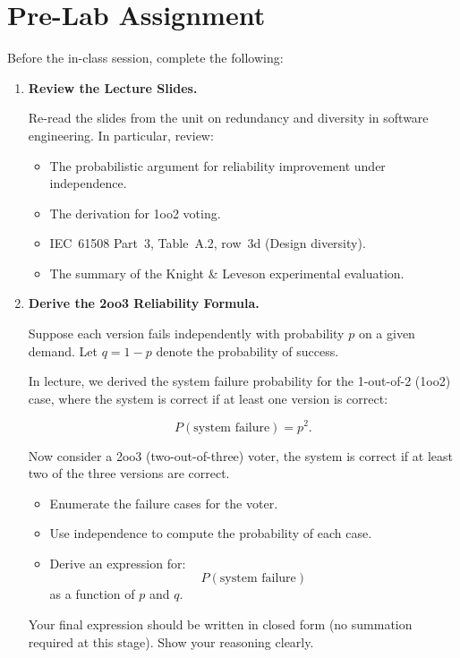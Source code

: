 \section{Pre-Lab Assignment}

Before the in-class session, complete the following:

\begin{enumerate}

  \item \textbf{Review the Lecture Slides.}

  Re-read the slides from the unit on redundancy and diversity in software engineering.
  In particular, review:

  \begin{itemize}
    \item The probabilistic argument for reliability improvement under independence.
    \item The derivation for 1oo2 voting.
    \item IEC~61508 Part~3, Table~A.2, row~3d (Design diversity).
    \item The summary of the Knight \& Leveson experimental evaluation.
  \end{itemize}

  \item \textbf{Derive the 2oo3 Reliability Formula.}

  Suppose each version fails independently with probability $p$ on a given demand.
  Let $q = 1 - p$ denote the probability of success.

  In lecture, we derived the system failure probability for the 1-out-of-2 (1oo2) case, where the system is correct if at least one version is correct:

  \[
    P(\text{system failure}) = p^2.
  \]

  Now consider a 2oo3 (two-out-of-three) voter, \ie the system is correct if at least two of the three versions are correct.

  \begin{itemize}
    \item Enumerate the failure cases for the voter.
    \item Use independence to compute the probability of each case.
    \item Derive an expression for:
    \[
      P(\text{system failure})
    \]
    as a function of $p$ and $q$.
  \end{itemize}

  Your final expression should be written in closed form (no summation required at this stage).
  Show your reasoning clearly.


\end{enumerate}
